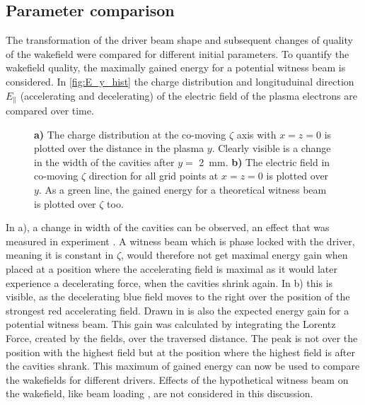 \documentclass[bachelor_thesis]{subfiles}
\begin{document}
\subsection{Parameter comparison}
The transformation of the driver beam shape and subsequent changes of quality of the wakefield were compared for different initial parameters. To quantify the wakefield quality, the maximally gained energy 
for a potential witness beam is considered. In \autoref{fig:E_y_hist} the charge distribution and longituduinal direction $E_{\parallel}$ (accelerating and decelerating) of the electric field of the plasma electrons are compared over time. 
\begin{figure}
	\centering
	
	\caption{
	\textbf{a)} The charge distribution at the co-moving $\zeta$ axis with $x=z=0$ is plotted over the distance in the plasma $y$. Clearly visible is a change in the width of the cavities after $y=$ \qty{2}{\mm}.
	\textbf{b)} The electric field in co-moving $\zeta$ direction for all grid points at $x=z=0$ is plotted over $y$. As a green line, the gained energy for a theoretical witness beam is plotted over $\zeta$ too.}
	\label{fig:E_y_hist}
\end{figure}

In a), a change in width of the cavities can be observed, an effect that was measured in experiment \cite{Schoebel2022}. A witness beam which is phase locked with the driver, meaning it is constant in $\zeta$,
would therefore not get maximal energy gain when placed at a position where the accelerating field is maximal as it would later experience a decelerating force, when the cavities shrink again.
In b) this is visible, as the decelerating blue field moves to the right over the position of the strongest red accelerating field. Drawn in is also the expected energy gain for a potential witness beam.
This gain was calculated by integrating the Lorentz Force, created by the fields, over the traversed distance. The peak is not over the position with the highest field but at the position where the highest field is after the cavities shrank.
This maximum of gained energy can now be used to compare the wakefields for different drivers. Effects of the hypothetical witness beam on the wakefield, like beam loading \cite{Kirchen2021, Goetzfried2020}, are not considered in this discussion.
\end{document}
